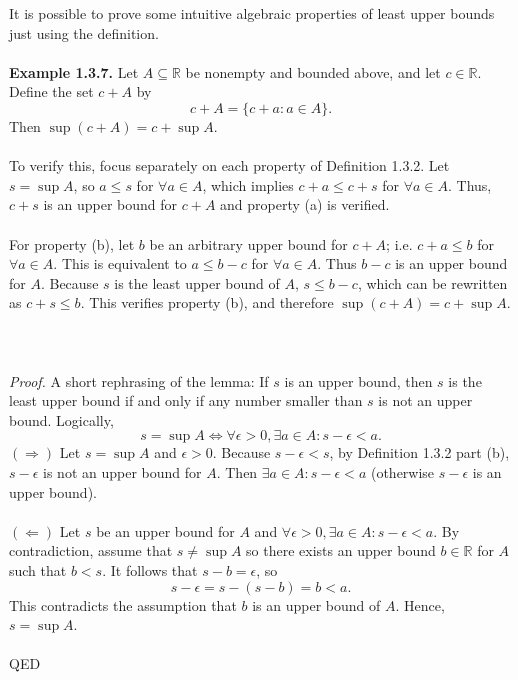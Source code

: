 \documentclass{article}
\begin{document}
        It is possible to prove some intuitive algebraic properties of least upper bounds just using the definition.\\ \\
        \textbf{Example 1.3.7.} Let $A \subseteq \mathbb{R}$ be nonempty and bounded above, and let $c \in \mathbb{R}$. Define the set $c + A$ by
        \begin{equation*}
            c+A = \{ c+a : a \in A\}.
        \end{equation*}
        Then $\sup(c+A) =  c + \sup A$.\\ \\
        To verify this, focus separately on each property of Definition 1.3.2. Let $s=\sup A$, so $a \leq s$ for $\forall a \in A$, which implies $c+a \leq c+s$ for $\forall a \in A$. Thus, $c+s$ is an upper bound for $c+A$ and property (a) is verified.\\ \\
        For property (b), let $b$ be an arbitrary upper bound for $c+A$; i.e. $c+a \leq b$ for $\forall a \in A$. This is equivalent to $a \leq b-c$ for $\forall a \in A$. Thus $b-c$ is an upper bound for $A$. Because $s$ is the least upper bound of $A$, $s \leq b-c$, which can be rewritten as $c+s \leq b$. This verifies property (b), and therefore $\sup (c+A) = c + \sup A$.
        \\ \\
        \\ \\
        \textit{Proof.} A short rephrasing of the lemma: If $s$ is an upper bound, then $s$ is the least upper bound if and only if any number smaller than $s$ is not an upper bound. Logically,
        \begin{equation*}
            s = \sup A \iff \forall \epsilon >0, \exists a \in A: s - \epsilon < a.
        \end{equation*}
        $(\Rightarrow)$ Let $s = \sup A$ and $\epsilon > 0$. Because $s - \epsilon < s$, by Definition 1.3.2 part (b), $s - \epsilon$ is not an upper bound for $A$. Then $\exists a \in A: s- \epsilon < a$ (otherwise $s-\epsilon$ is an upper bound).
        \\ \\
        $(\Leftarrow)$ Let $s$ be an upper bound for $A$ and $\forall \epsilon > 0,\exists a \in A: s - \epsilon < a$. By contradiction, assume that $s \neq \sup A$ so there exists an upper bound $b \in \mathbb{R}$ for $A$ such that $b<s$. It follows that $s - b = \epsilon$, so
        \begin{equation*}
            s-\epsilon = s - (s-b) = b < a.
        \end{equation*} 
        This contradicts the assumption that $b$ is an upper bound of $A$. Hence, $s = \sup A$.\\ \\ 
        QED
    
\end{document}
